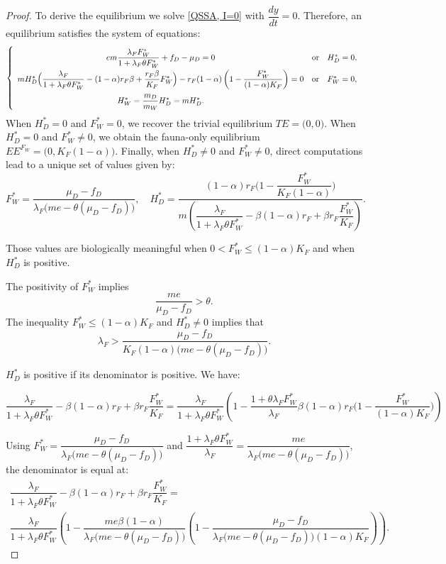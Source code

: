 \documentclass{article}
\newcommand{\lfw}{\lambda_{F}}
\newcommand{\lfw}{\lambda_{F}}
\begin{document}
\begin{proof}
To derive the equilibrium we solve \eqref{QSSA, I=0} with $\dfrac{d y}{dt} = 0$. Therefore, an equilibrium satisfies the system of equations:
\begin{equation}\label{systemEquilibre, I=0}
\def\arraystretch{2}
\left\lbrace \begin{array}{cll}
 e m \dfrac{\lfw F_W^*}{1 + \lfw \theta F_W^*} + f_D - \mu_D = 0& \mbox{or} & H_D^* = 0,\\
m H_D^*\Big(\dfrac{\lfw}{1 + \lfw \theta F_W^*} - (1-\alpha)r_F \beta + \dfrac{r_F \beta}{K_F}F_W^* \Big) - r_F(1-\alpha) \left(1- \dfrac{F_W^*}{(1-\alpha)K_F}\right)= 0& \mbox{or} & F^*_W = 0,\\
H_W^* = \dfrac{m_D}{m_W} H_D^* = m H_D^*.&&
\end{array} \right.
\end{equation}
When $H_D^*=0$ and $F_W^*=0$, we recover the trivial equilibrium $TE = \Big(0,0\Big)$. When $H_D^*=0$ and $F_W^*\neq0$, we obtain the fauna-only equilibrium $EE^{F_W} = \Big(0, K_F(1-\alpha) \Big)$. Finally, when $H_D^*\neq0$ and $F_W^*\neq0$, direct computations lead to a unique set of values given by:
$$
F^*_{W} = \dfrac{\mu_D - f_D}{\lfw \big(me - \theta (\mu_D - f_D) \big)  },
\quad 
H^*_{D} = \dfrac{(1-\alpha)r_F\Big(1 - \dfrac{F^*_{W}}{K_F(1-\alpha)} \Big)}{m\left(\dfrac{\lfw}{1 + \lfw \theta F_W^*} - \beta (1-\alpha) r_F + \beta r_F  \dfrac{F^*_{W}}{K_F}\right)}
.$$

Those values are biologically meaningful when $0 < F_W^* \leq (1-\alpha) K_F$ and when $H_D^*$ is positive. 

The positivity of $F_W^*$ implies $$\dfrac{me}{\mu_D - f_D} > \theta.$$
The inequality $F_W^* \leq (1-\alpha) K_F $ and $H_D^* \neq 0$ implies that
$$
\lfw > \dfrac{\mu_D - f_D}{ K_F(1-\alpha) \big(me - \theta (\mu_D - f_D) \big)}.
$$

$H_D^*$ is positive if its denominator is positive. We have:

\begin{equation*}
\dfrac{\lfw}{1 + \lfw \theta F_W^*} - \beta (1-\alpha) r_F + \beta r_F  \dfrac{F^*_{W}}{K_F} = \dfrac{\lfw}{1 + \lfw \theta F_W^*}\left(1 - \dfrac{1 +\theta \lfw F_W^*}{\lfw}\beta (1-\alpha) r_F\Big(1 - \dfrac{F_W^*}{(1-\alpha)K_F} \Big)\right) 
\end{equation*}

Using $F^*_{W} = \dfrac{\mu_D - f_D}{\lfw \big(me - \theta (\mu_D - f_D) \big)  }$ and $\dfrac{1 + \lfw \theta F_W^*}{\lfw} = \dfrac{me}{\lfw \big(m e - \theta (\mu_D - f_D)\big)}$, the denominator is equal at:
\begin{multline*}
\dfrac{\lfw}{1 + \lfw \theta F_W^*} - \beta (1-\alpha) r_F + \beta r_F  \dfrac{F^*_{W}}{K_F} = \\ \dfrac{\lfw}{1 + \lfw \theta F_W^*}\left(1 - \dfrac{me \beta(1-\alpha)}{\lfw \big(m e - \theta (\mu_D - f_D)\big)}\left(1 - \dfrac{\mu_D - f_D}{\lfw \big(me - \theta (\mu_D - f_D) \big)(1-\alpha)K_F } \right)\right).
\end{multline*}


\end{proof}
\end{document}
